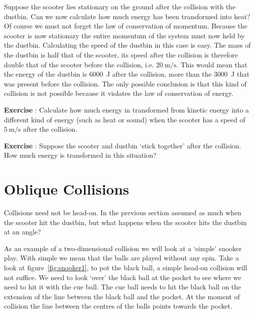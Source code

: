\documentclass[12pt,a4paper]{article}
\numberwithin{equation}{section}
\numberwithin{figure}{section}
\newcounter{Exercise}
\numberwithin{table}{section}
\begin{document}
Suppose the scooter lies stationary on the ground after the collision with the dustbin. Can we now calculate how much energy has been transformed into heat? Of course we must not forget the law of conservation of momentum. Because the scooter is now stationary the entire momentum of the system must now held by the dustbin. Calculating the speed of the dustbin in this case is easy. The mass of the dustbin is half that of the scooter, its speed after the collision is therefore double that of the scooter before the collision, i.e. $20~\mbox{m/s}$. This would mean that the energy of the dustbin is 6000~J after the collision, more than the 3000~J that was present before the collision. The only possible conclusion is that this kind of collision is not possible because it violates the law of conservation of energy.


\begin{shaded}
\textbf{Exercise \theExercise {}} : Calculate how much energy in transformed from kinetic energy into a different kind of energy (such as heat or sound) when the scooter has a speed of $5~\mbox{m/s}$ after the collision.\end{shaded}
\begin{shaded}
\textbf{Exercise \theExercise {}} : Suppose the scooter and dustbin `stick together' after the collision. How much energy is transformed in this situation? \end{shaded}

\section{Oblique Collisions}
Collisions need not be head-on. In the previous section assumed as much when the scooter hit the dustbin, but what happens when the scooter hits the dustbin at an angle?

As an example of a two-dimensional collision we will look at a `simple' snooker play. With simple we mean that the balls are played without any spin. Take a look at figure~\ref{fig:snooker1}, to pot the black ball, a simple head-on collision will not suffice. We need to look `over' the black ball at the pocket to see where we need to hit it with the cue ball. The cue ball needs to hit the black ball on the extension of the line between the black ball and the pocket. At the moment of collision the line between the centres of the balls points towards the pocket. 
\end{document}
